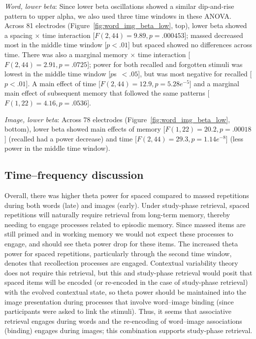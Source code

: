 \textit{Word, lower beta}:  Since lower beta oscillations showed a similar dip-and-rise pattern to upper alpha, we also used three time windows in these ANOVA.  Across 81 electrodes (Figure~\ref{fig:word_img_beta_low}, top), lower beta showed a spacing $\times$ time interaction [$F(2,44)=9.89, p=.000453$]; massed decreased most in the middle time window [$p<.01$] but spaced showed no differences across time.  There was also a marginal memory $\times$ time interaction [$F(2,44)=2.91, p=.0725$]; power for both recalled and forgotten stimuli was lowest in the middle time window [$p$s~$<.05$], but was most negative for recalled [$p<.01$].
A main effect of time [$F(2,44)=12.9, p=5.28e^{-5}$] and a marginal main effect of subsequent memory that followed the same patterns [$F(1,22)=4.16, p=.0536$].

\textit{Image, lower beta}: Across 78 electrodes (Figure~\ref{fig:word_img_beta_low}, bottom), lower beta showed main effects of memory [$F(1,22)=20.2, p=.00018$] (recalled had a power decrease) and time [$F(2,44)=29.3, p=1.14e^{-8}$] (less power in the middle time window).


\subsection{Time--frequency discussion}


Overall, there was higher theta power for spaced compared to massed repetitions during both words (late) and images (early).
Under study-phase retrieval, spaced repetitions will naturally require retrieval from long-term memory, thereby needing to engage processes related to episodic memory.  Since massed items are still primed and in working memory we would not expect these processes to engage, and should see theta power drop for these items.
The increased theta power for spaced repetitions, particularly through the second time window, denotes that recollection processes are engaged.  Contextual variability theory does not require this retrieval, but this and study-phase retrieval would posit that spaced items will be encoded (or re-encoded in the case of study-phase retrieval) with the evolved contextual state, so theta power should be maintained into the image presentation during processes that involve word--image binding (since participants were asked to link the stimuli).
\cbstart
Thus, it seems that associative retrieval engages during words and the re-encoding of word--image associations (binding) engages during images; this combination supports study-phase retrieval.

